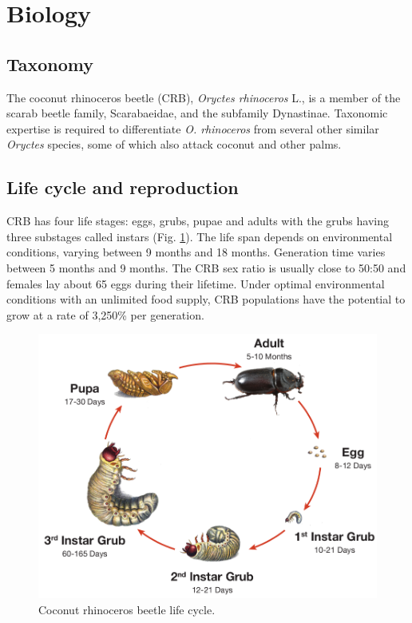 \documentclass[twocolumn,letterpaper]{scrartcl}
\begin{document}
\section{Biology}

\subsection{Taxonomy}

The coconut rhinoceros beetle (CRB), \textit{Oryctes rhinoceros} L., is a member of the scarab beetle  family, Scarabaeidae, and the subfamily Dynastinae. Taxonomic expertise is required to differentiate \textit{O. rhinoceros} from several other similar \textit{Oryctes} species, some of which also attack coconut and other palms.


\subsection{Life cycle and reproduction}
CRB has four life stages: eggs, grubs, pupae and adults with the grubs having three substages called instars (Fig. \ref{fig:crblifecycle}). The life span depends on environmental conditions, varying between 9 months and 18 months. Generation time varies between 5 months and 9 months.
The CRB sex ratio is usually close to 50:50 and females lay about 65 eggs during their lifetime. Under optimal environmental conditions with an unlimited food supply, CRB populations have the potential to grow at a rate of 3,250\% per generation.

\begin{figure}[h!]
	\centering
	\includegraphics[width=\linewidth]{images/crb_life_cycle}
	\caption{Coconut rhinoceros beetle life cycle.}
	\label{fig:crblifecycle}
\end{figure}
\end{document}
